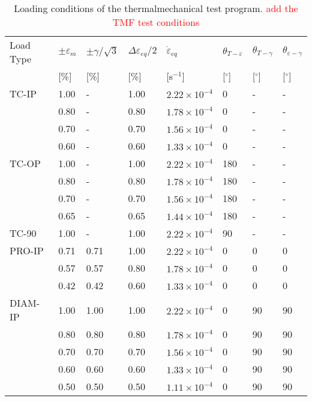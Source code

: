 \documentclass[preprint,5p,twocolumn,11pt,sort&compress]{elsarticle}
\newcommand{\marked}[1]{\textcolor{red}{#1}}
\begin{document}
\begin{table*}[htbp]
  \centering
  \caption{Loading conditions of the thermalmechanical test program. \marked{add the TMF test conditions}} \vspace{0.1cm}
    \begin{tabular}{p{2cm}p{1.5cm}p{1.5cm}p{1.5cm}p{2.5cm}p{1cm}p{1cm}p{1cm}}
    \hline
    Load Type & $\pm \varepsilon _m$ & $\pm \gamma/ \sqrt 3$ & $\Delta\varepsilon _{eq}/2$ & $\dot \varepsilon _{eq}$ & $\theta_{T-\varepsilon}$ & $\theta_{T-\gamma}$ & $\theta_{\varepsilon-\gamma}$ \\
          & [\%]  & [\%]  & [\%]  & [s$^{-1}$] & [$^\circ$] & [$^\circ$] & [$^\circ$]  \\
    \hline
    TC-IP & 1.00  & -     & 1.00  & $2.22\times 10^{-4}$ & 0     & -     & -   \\
          & 0.80  & -     & 0.80  & $1.78\times 10^{-4}$ & 0     & -     & -    \\
          & 0.70  & -     & 0.70  & $1.56\times 10^{-4}$ & 0     & -     & -    \\
          & 0.60  & -     & 0.60  & $1.33\times 10^{-4}$ & 0     & -     & -     \\
    \hline
    TC-OP & 1.00  & -     & 1.00  & $2.22\times 10^{-4}$ & 180   & -     & -    \\
          & 0.80  & -     & 0.80  & $1.78\times 10^{-4}$ & 180   & -     & -    \\
          & 0.70  & -     & 0.70  & $1.56\times 10^{-4}$ & 180   & -     & -    \\
          & 0.65  & -     & 0.65  & $1.44\times 10^{-4}$ & 180   & -     & -    \\
    \hline
    TC-90 & 1.00  & -     & 1.00  & $2.22\times 10^{-4}$ & 90    & -     & -    \\
    \hline
    PRO-IP & 0.71  & 0.71  & 1.00  & $2.22\times 10^{-4}$ & 0     & 0     & 0    \\
          & 0.57  & 0.57  & 0.80  & $1.78\times 10^{-4}$ & 0     & 0     & 0    \\
          & 0.42  & 0.42  & 0.60  & $1.33\times 10^{-4}$ & 0     & 0     & 0     \\
    \hline
    DIAM-IP & 1.00  & 1.00  & 1.00  & $2.22\times 10^{-4}$ & 0     & 90    & 90  \\
          & 0.80  & 0.80  & 0.80  & $1.78\times 10^{-4}$ & 0     & 90    & 90  \\
          & 0.70  & 0.70  & 0.70  & $1.56\times 10^{-4}$ & 0     & 90    & 90   \\
          & 0.60  & 0.60  & 0.60  & $1.33\times 10^{-4}$ & 0     & 90    & 90   \\
          & 0.50  & 0.50  & 0.50  & $1.11\times 10^{-4}$ & 0     & 90    & 90    \\
    \hline
    \end{tabular}%
  \label{tab:Loading-Conditions-TMF}%
\end{table*}%
\end{document}
